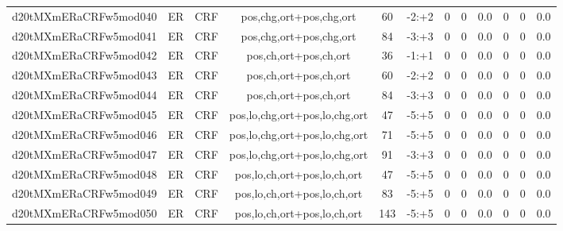 \documentclass[a4paper]{article}
\begin{document}
\begin{landscape}
\begin{center}
\begin{tabular}{ |c|c|c|c|c|c|c|c|c|c|c|c|}
 
 	
 	\small{ d20tMXmERaCRFw5mod040 } & ER & CRF & pos,chg,ort+pos,chg,ort  &  60 &  -2:+2  &  0 & 0 & 0.0  &  0 & 0 & 0.0 \\
 	

 
 	
 	\small{ d20tMXmERaCRFw5mod041 } & ER & CRF & pos,chg,ort+pos,chg,ort  &  84 &  -3:+3  &  0 & 0 & 0.0  &  0 & 0 & 0.0 \\
 	

 
 	
 	\small{ d20tMXmERaCRFw5mod042 } & ER & CRF & pos,ch,ort+pos,ch,ort  &  36 &  -1:+1  &  0 & 0 & 0.0  &  0 & 0 & 0.0 \\
 	

 
 	
 	\small{ d20tMXmERaCRFw5mod043 } & ER & CRF & pos,ch,ort+pos,ch,ort  &  60 &  -2:+2  &  0 & 0 & 0.0  &  0 & 0 & 0.0 \\
 	

 
 	
 	\small{ d20tMXmERaCRFw5mod044 } & ER & CRF & pos,ch,ort+pos,ch,ort  &  84 &  -3:+3  &  0 & 0 & 0.0  &  0 & 0 & 0.0 \\
 	

 
 	
 	\small{ d20tMXmERaCRFw5mod045 } & ER & CRF & pos,lo,chg,ort+pos,lo,chg,ort  &  47 &  -5:+5  &  0 & 0 & 0.0  &  0 & 0 & 0.0 \\
 	

 
 	
 	\small{ d20tMXmERaCRFw5mod046 } & ER & CRF & pos,lo,chg,ort+pos,lo,chg,ort  &  71 &  -5:+5  &  0 & 0 & 0.0  &  0 & 0 & 0.0 \\
 	

 
 	
 	\small{ d20tMXmERaCRFw5mod047 } & ER & CRF & pos,lo,chg,ort+pos,lo,chg,ort  &  91 &  -3:+3  &  0 & 0 & 0.0  &  0 & 0 & 0.0 \\
 	

 
 	
 	\small{ d20tMXmERaCRFw5mod048 } & ER & CRF & pos,lo,ch,ort+pos,lo,ch,ort  &  47 &  -5:+5  &  0 & 0 & 0.0  &  0 & 0 & 0.0 \\
 	

 
 	
 	\small{ d20tMXmERaCRFw5mod049 } & ER & CRF & pos,lo,ch,ort+pos,lo,ch,ort  &  83 &  -5:+5  &  0 & 0 & 0.0  &  0 & 0 & 0.0 \\
 	

 
 	
 	\small{ d20tMXmERaCRFw5mod050 } & ER & CRF & pos,lo,ch,ort+pos,lo,ch,ort  &  143 &  -5:+5  &  0 & 0 & 0.0  &  0 & 0 & 0.0 \\
 	


\end{tabular}
\end{center}
\end{landscape}
\end{document}

